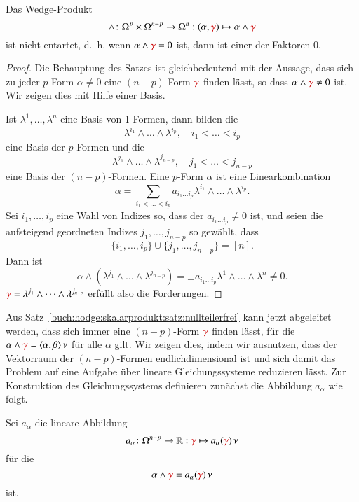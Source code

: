 \begin{satz}
\label{buch:hodge:skalarprodukt:satz:nullteilerfrei}
Das Wedge-Produkt
\[
\wedge
\colon
\Omega^p \times \Omega^{n-p}
\to
\Omega^n
:
(\alpha,{\color{darkred}\gamma})
\mapsto
\alpha\wedge{\color{darkred}\gamma}
\]
ist nicht entartet, d.~h. wenn $\alpha\wedge{\color{darkred}\gamma}=0$
ist, dann ist einer der Faktoren 0.
\end{satz}

\begin{proof}
Die Behauptung des Satzes ist gleichbedeutend mit der Aussage, dass 
sich zu jeder $p$-Form $\alpha\ne 0$ eine $(n-p)$-Form ${\color{darkred}\gamma}$
finden lässt, so dass $\alpha\wedge{\color{darkred}\gamma}\ne  0$ ist.
Wir zeigen dies mit Hilfe einer Basis.

Ist $\lambda^1,\dots,\lambda^n$ eine Basis von 1-Formen, dann bilden
die
\[
\lambda^{i_1}\wedge\dots\wedge\lambda^{i_p},\quad i_1<\dots<i_p
\]
eine Basis der $p$-Formen und die
\[
\lambda^{j_1}\wedge\dots\wedge\lambda^{j_{n-p}},\quad j_1<\dots<j_{n-p}
\]
eine Basis der $(n-p)$-Formen.
Eine $p$-Form $\alpha$ ist eine Linearkombination
\[
\alpha
=
\sum_{i_1<\dots<i_p}
a_{i_1\dots i_p} \lambda^{i_1}\wedge\dots\wedge \lambda^{i_p}.
\]
Sei $i_1,\dots,i_p$ eine Wahl von Indizes so, dass
der $a_{i_1\dots i_p}\ne 0$ ist, und seien die aufsteigend geordneten
Indizes $j_1,\dots,j_{n-p}$ so gewählt, dass
\[
\{i_1,\dots,i_p\}\cup\{j_1,\dots,j_{n-p}\} = [n].
\]
Dann ist
\[
\alpha\wedge(\lambda^{j_1}\wedge\dots\wedge\lambda^{j_{n-p}})
=
\pm
a_{i_1\dots i_p} \lambda^1\wedge\dots\wedge\lambda^n
\ne
0.
\]
${\color{darkred}\gamma}=\lambda^{j_1}\wedge\dots\wedge\lambda^{j_{n-p}}$
erfüllt also die Forderungen.
\end{proof}

Aus Satz~\ref{buch:hodge:skalarprodukt:satz:nullteilerfrei} kann jetzt
abgeleitet werden, dass sich immer eine $(n-p)$-Form ${\color{darkred}\gamma}$
finden lässt, für die $\alpha\wedge{\color{darkred}\gamma}=
\langle\alpha,\beta\rangle\,\nu$ für alle $\alpha$ gilt.
Wir zeigen dies, indem wir ausnutzen, dass der Vektorraum der
$(n-p)$-Formen endlichdimensional ist und sich damit das Problem
auf eine Aufgabe über lineare Gleichungssysteme reduzieren lässt.
Zur Konstruktion des Gleichungssystems definieren zunächst die
Abbildung $a_\alpha$ wie folgt.

\begin{definition}
\label{buch:hodge:koordinatenfrei:def:hodgekoordinatenfrei}
Sei $a_\alpha$ die lineare Abbildung
\[
a_\alpha
\colon
\Omega^{n-p}
\to
\mathbb{R}
:
{\color{darkred}\gamma}
\mapsto
a_\alpha({\color{darkred}\gamma})\,\nu
\]
für die
\[
\alpha\wedge{\color{darkred}\gamma}
=
a_\alpha({\color{darkred}\gamma})\,\nu
\]
ist.
\end{definition}

